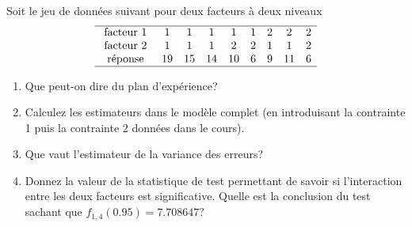 \documentclass{td_um}
\providecommand{\1}{\mathds{1}}
\begin{document}
\exo{} Soit le jeu de données suivant pour deux facteurs à deux niveaux
\[
    \begin{array}{ccccccccc} \hline\text { facteur 1 } & 1 & 1 & 1 & 1 & 1 & 2 & 2 & 2 \\ \text { facteur 2 } & 1 & 1 & 1 & 2 & 2 & 1 & 1 & 2 \\ \text { réponse } & 19 & 15 & 14 & 10 & 6 & 9 & 11 & 6\\\hline\end{array}
\]
\begin{enumerate}
    \item  Que peut-on dire du plan d'expérience?
    \item  Calculez les estimateurs dans le modèle complet (en introduisant la contrainte 1 puis la contrainte 2 données dans le cours).
    \item  Que vaut l'estimateur de la variance des erreurs?
    \item  Donnez la valeur de la statistique de test permettant de savoir si l'interaction entre les deux facteurs est significative. Quelle est la conclusion du test sachant que $f_{1,4}(0.95)=7.708647 ?$
\end{enumerate}
\end{document}
